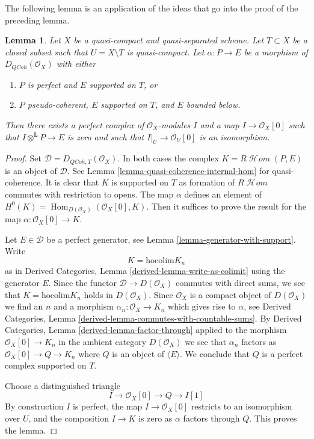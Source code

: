 \documentclass{stacks-project}
\theoremstyle{plain}
\newtheorem{lemma}[subsection]{Lemma}
\theoremstyle{definition}
\theoremstyle{remark}
\numberwithin{equation}{subsection}
\def\Hom{\mathop{\mathrm{Hom}}\nolimits}
\def\SheafHom{\mathop{\mathcal{H}\!\mathit{om}}\nolimits}
\def\QCoh{\mathit{QCoh}}
\begin{document}
\noindent
The following lemma is an application of the ideas that go into
the proof of the preceding lemma.

\begin{lemma}
\label{lemma-map-from-pseudo-coherent-to-complex-with-support}
Let $X$ be a quasi-compact and quasi-separated scheme. Let $T \subset X$
be a closed subset such that $U = X \setminus T$ is quasi-compact.
Let $\alpha : P \to E$ be a morphism of $D_\QCoh(\mathcal{O}_X)$ with
either
\begin{enumerate}
\item $P$ is perfect and $E$ supported on $T$, or
\item $P$ pseudo-coherent, $E$ supported on $T$, and $E$ bounded below.
\end{enumerate}
Then there exists a perfect complex of $\mathcal{O}_X$-modules $I$
and a map $I \to \mathcal{O}_X[0]$ such that
$I \otimes^\mathbf{L} P \to E$ is zero and such that
$I|_U \to \mathcal{O}_U[0]$ is an
isomorphism.
\end{lemma}

\begin{proof}
Set $\mathcal{D} = D_{\QCoh, T}(\mathcal{O}_X)$. In both cases the complex
$K = R\SheafHom(P, E)$ is an object of $\mathcal{D}$. See
Lemma \ref{lemma-quasi-coherence-internal-hom} for quasi-coherence.
It is clear that $K$ is supported on $T$ as formation of $R\SheafHom$
commutes with restriction to opens.
The map $\alpha$ defines an element of
$H^0(K) = \Hom_{D(\mathcal{O}_X)}(\mathcal{O}_X[0], K)$.
Then it suffices to prove the result for the map
$\alpha : \mathcal{O}_X[0] \to K$.

\medskip\noindent
Let $E \in \mathcal{D}$ be a perfect generator, see
Lemma \ref{lemma-generator-with-support}. Write
$$
K = \text{hocolim} K_n
$$
as in Derived Categories, Lemma \ref{derived-lemma-write-as-colimit}
using the generator $E$. Since the functor $\mathcal{D} \to D(\mathcal{O}_X)$
commutes with direct sums, we see that $K = \text{hocolim} K_n$
holds in $D(\mathcal{O}_X)$. Since $\mathcal{O}_X$ is a compact
object of $D(\mathcal{O}_X)$ we find an $n$ and a morphism
$\alpha_n : \mathcal{O}_X \to K_n$ which gives rise to $\alpha$, see
Derived Categories, Lemma \ref{derived-lemma-commutes-with-countable-sums}.
By Derived Categories, Lemma \ref{derived-lemma-factor-through}
applied to the morphism $\mathcal{O}_X[0] \to K_n$ in the ambient
category $D(\mathcal{O}_X)$ we see that $\alpha_n$ factors as
$\mathcal{O}_X[0] \to Q \to K_n$ where $Q$ is an object
of $\langle E \rangle$. We conclude that $Q$ is a perfect complex
supported on $T$.

\medskip\noindent
Choose a distinguished triangle
$$
I \to \mathcal{O}_X[0] \to Q \to I[1]
$$
By construction $I$ is perfect, the map $I \to \mathcal{O}_X[0]$
restricts to an isomorphism over $U$, and the composition
$I \to K$ is zero as $\alpha$ factors through $Q$.
This proves the lemma.
\end{proof}
\end{document}
